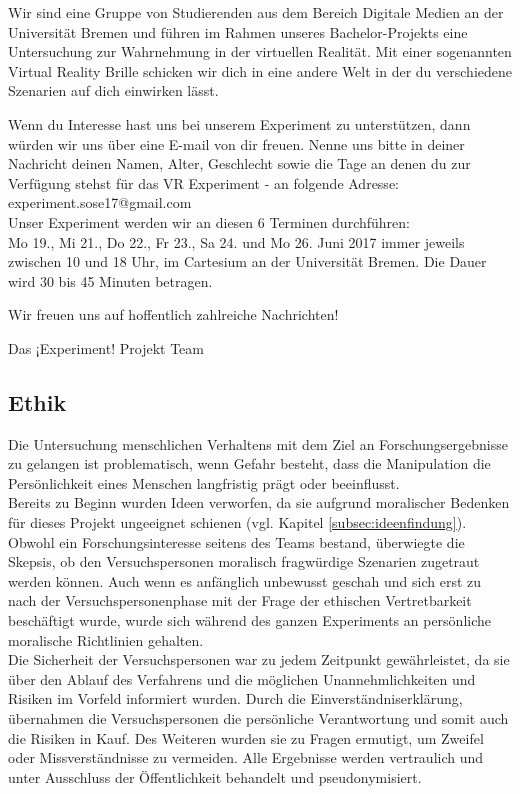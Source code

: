 \documentclass{Bericht}
\begin{document}
Wir sind eine Gruppe von Studierenden aus dem Bereich Digitale Medien an der Universität Bremen und führen im Rahmen unseres Bachelor-Projekts eine Untersuchung zur Wahrnehmung in der virtuellen Realität. Mit einer sogenannten Virtual Reality Brille schicken wir dich in eine andere Welt in der du verschiedene Szenarien auf dich einwirken lässt.

Wenn du Interesse hast uns bei unserem Experiment zu unterstützen, dann würden wir uns über eine E-mail von dir freuen. Nenne uns bitte in deiner Nachricht deinen Namen, Alter, Geschlecht sowie die Tage an denen du zur Verfügung stehst für das VR Experiment - an folgende Adresse: experiment.sose17@gmail.com \\

Unser Experiment werden wir an diesen 6 Terminen durchführen: \\

Mo 19., Mi 21., Do 22., Fr 23., Sa 24. und Mo 26. Juni 2017 immer jeweils zwischen 10 und 18 Uhr, im Cartesium an der Universität Bremen. Die Dauer wird 30 bis 45 Minuten betragen.

Wir freuen uns auf hoffentlich zahlreiche Nachrichten!

Das ¡Experiment! Projekt Team
\par 
\endgroup


\subsection{Ethik}
Die Untersuchung menschlichen Verhaltens mit dem Ziel an Forschungsergebnisse zu gelangen ist problematisch, wenn Gefahr besteht, dass die Manipulation die Persönlichkeit eines Menschen langfristig prägt oder beeinflusst.\\
 Bereits zu Beginn wurden Ideen verworfen, da sie aufgrund moralischer Bedenken für dieses Projekt ungeeignet schienen (vgl. Kapitel \ref{subsec:ideenfindung}). Obwohl ein Forschungsinteresse seitens des Teams bestand, überwiegte die Skepsis, ob den Versuchspersonen moralisch fragwürdige Szenarien zugetraut werden können. Auch wenn es anfänglich unbewusst geschah und sich erst zu nach der Versuchspersonenphase mit der Frage der ethischen Vertretbarkeit beschäftigt wurde, wurde sich während des ganzen Experiments an persönliche moralische Richtlinien gehalten. \\
Die Sicherheit der Versuchspersonen war zu jedem Zeitpunkt gewährleistet, da sie über den Ablauf des Verfahrens und die möglichen Unannehmlichkeiten und Risiken im Vorfeld informiert wurden. Durch die Einverständniserklärung, übernahmen die Versuchspersonen die persönliche Verantwortung und somit auch die Risiken in Kauf. Des Weiteren wurden sie zu Fragen ermutigt, um Zweifel oder Missverständnisse zu vermeiden. Alle Ergebnisse werden vertraulich und unter Ausschluss der Öffentlichkeit behandelt und pseudonymisiert.
\end{document}
